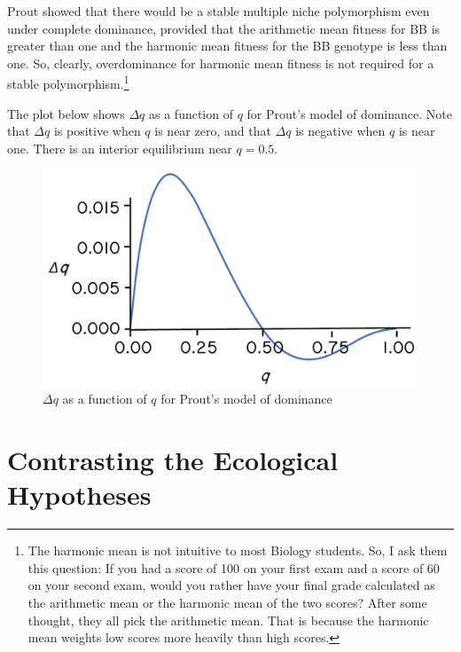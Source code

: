\documentclass[
  letterpaper,
]{book}
\begin{document}
Prout showed that there would be a stable multiple niche polymorphism
even under complete dominance, provided that the arithmetic mean fitness
for BB is greater than one and the harmonic mean fitness for the BB
genotype is less than one. So, clearly, overdominance for harmonic mean
fitness is not required for a stable polymorphism.\footnote{The harmonic
  mean is not intuitive to most Biology students. So, I ask them this
  question: If you had a score of 100 on your first exam and a score of
  60 on your second exam, would you rather have your final grade
  calculated as the arithmetic mean or the harmonic mean of the two
  scores? After some thought, they all pick the arithmetic mean. That is
  because the harmonic mean weights low scores more heavily than high
  scores.}

The plot below shows \(\Delta q\) as a function of \(q\) for Prout's
model of dominance. Note that \(\Delta q\) is positive when \(q\) is
near zero, and that \(\Delta q\) is negative when \(q\) is near one.
There is an interior equilibrium near \(q = 0.5\).

\begin{figure}[H]

{\centering \includegraphics{images/fig2-5_hr.png}

}

\caption[Prout's model of dominance]{\(\Delta q\) as a function of \(q\)
for Prout's model of dominance}

\end{figure}%


\chapter{Contrasting the Ecological Hypotheses}\label{sec-eco-hyp-cont}
\end{document}
